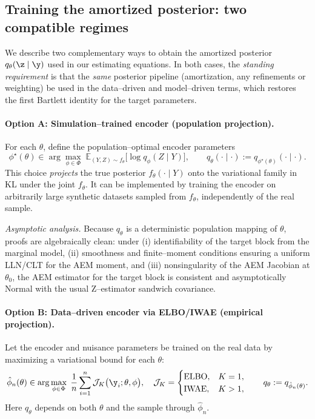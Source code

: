 {\color{red}
\subsection{Training the amortized posterior: two compatible regimes}
\label{subsec:two-regimes}

We describe two complementary ways to obtain the amortized posterior $q_\theta(\z \mid \y)$ used in our estimating equations. In both cases, the \emph{standing requirement} is that the \emph{same} posterior pipeline (amortization, any refinements or weighting) be used in the data–driven and model–driven terms, which restores the first Bartlett identity for the target parameters.

\paragraph{Option A: Simulation–trained encoder (population projection).}
For each $\theta$, define the population–optimal encoder parameters
\[
\phi^\star(\theta) \in \arg\max_{\phi \in \Phi} \;
\mathbb{E}_{(Y,Z) \sim f_\theta} \big[ \log q_\phi(Z \mid Y) \big],
\qquad
q_\theta(\cdot \mid \cdot) := q_{\phi^\star(\theta)}(\cdot \mid \cdot).
\]
This choice \emph{projects} the true posterior $f_\theta(\cdot \mid Y)$ onto the variational family in KL under the joint $f_\theta$. It can be implemented by training the encoder on arbitrarily large synthetic datasets sampled from $f_\theta$, independently of the real sample.

\emph{Asymptotic analysis.} Because $q_\theta$ is a deterministic population mapping of $\theta$, proofs are algebraically clean: under (i) identifiability of the target block from the marginal model, (ii) smoothness and finite–moment conditions ensuring a uniform LLN/CLT for the AEM moment, and (iii) nonsingularity of the AEM Jacobian at $\theta_0$, the AEM estimator for the target block is consistent and asymptotically Normal with the usual Z–estimator sandwich covariance.

\paragraph{Option B: Data–driven encoder via ELBO/IWAE (empirical projection).}
Let the encoder and nuisance parameters be trained on the real data by maximizing a variational bound for each $\theta$:
\[
\hat\phi_n(\theta) \in \arg\max_{\phi \in \Phi} \;
\frac{1}{n} \sum_{i=1}^n \mathcal{J}_K\big(\y_i; \theta, \phi \big),
\quad
\mathcal{J}_K =
\begin{cases}
\text{ELBO}, & K=1,\\
\text{IWAE}, & K>1,
\end{cases}
\qquad
q_\theta := q_{\hat\phi_n(\theta)}.
\]
Here $q_\theta$ depends on both $\theta$ and the sample through $\hat\phi_n$.

}
